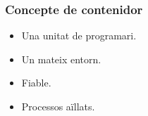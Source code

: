 \begin{frame}
  \frametitle{Concepte de contenidor}
  
  \begin{itemize}
    \item Una unitat de programari.
    \item Un mateix entorn.
    \item Fiable.
    \item Processos aïllats.
  \end{itemize}
  
\end{frame}
